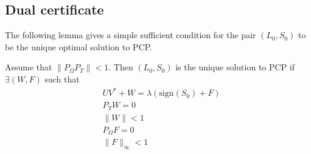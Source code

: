 \subsection{Dual certificate}
The following lemma gives a simple sufficient condition for the pair $(L_0,S_0)$ to be the unique optimal solution to PCP.

\begin{lemma}
Assume that $\|P_\Omega P_T \| < 1$. Then $(L_0,S_0)$ is the unique solution to PCP if $\exists (W, F)$ such that
\begin{equation}
\begin{aligned}
& UV^* + W = \lambda(\text{sign}(S_0) + F) \\
& P_T W = 0 \\
& \|W\|<1 \\
& P_\Omega F = 0 \\
& \|F\|_\infty < 1
\end{aligned}
\end{equation}

\end{lemma}


